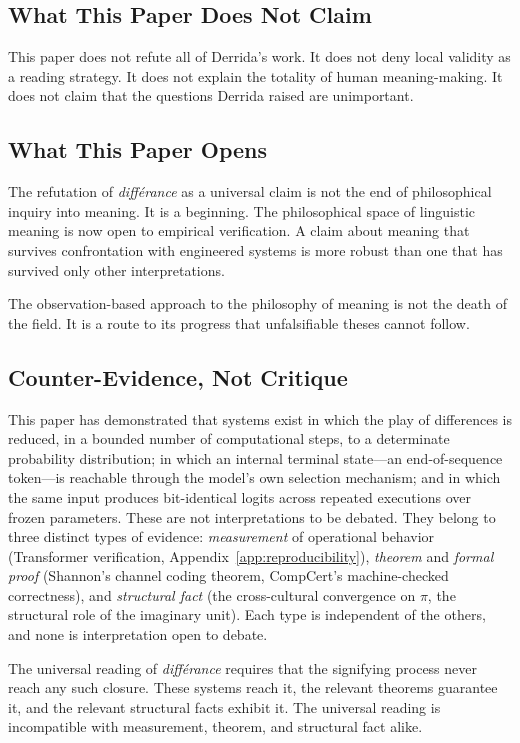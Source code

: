 \documentclass[a4paper,twocolumn,11pt]{article}
\begin{document}
\subsection{What This Paper Does Not Claim}

This paper does not refute all of Derrida's work. It does not deny local validity as a reading strategy. It does not explain the totality of human meaning-making. It does not claim that the questions Derrida raised are unimportant.

\subsection{What This Paper Opens}

The refutation of \emph{diff\'erance} as a universal claim is not the end of philosophical inquiry into meaning. It is a beginning. The philosophical space of linguistic meaning is now open to empirical verification. A claim about meaning that survives confrontation with engineered systems is more robust than one that has survived only other interpretations.

The observation-based approach to the philosophy of meaning is not the death of the field. It is a route to its progress that unfalsifiable theses cannot follow.

\subsection{Counter-Evidence, Not Critique}

This paper has demonstrated that systems exist in which the play of differences is reduced, in a bounded number of computational steps, to a determinate probability distribution; in which an internal terminal state---an end-of-sequence token---is reachable through the model's own selection mechanism; and in which the same input produces bit-identical logits across repeated executions over frozen parameters. These are not interpretations to be debated. They belong to three distinct types of evidence: \emph{measurement} of operational behavior (Transformer verification, Appendix~\ref{app:reproducibility}), \emph{theorem} and \emph{formal proof} (Shannon's channel coding theorem, CompCert's machine-checked correctness), and \emph{structural fact} (the cross-cultural convergence on $\pi$, the structural role of the imaginary unit). Each type is independent of the others, and none is interpretation open to debate.

The universal reading of \emph{diff\'erance} requires that the signifying process never reach any such closure. These systems reach it, the relevant theorems guarantee it, and the relevant structural facts exhibit it. The universal reading is incompatible with measurement, theorem, and structural fact alike.
\end{document}
